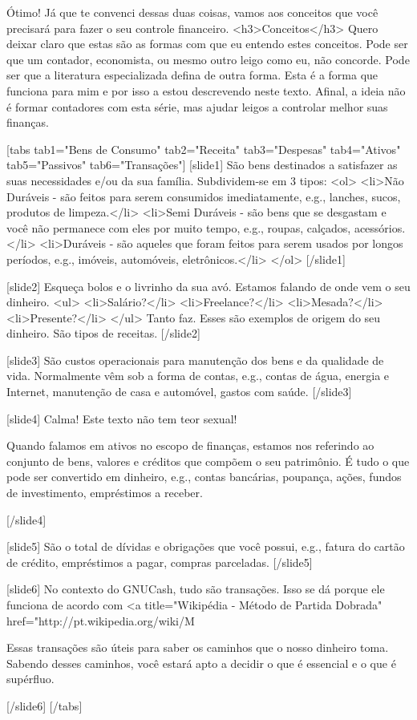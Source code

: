 Ótimo! Já que te convenci dessas duas coisas, vamos aos conceitos que você precisará para fazer o seu controle financeiro.
<h3>Conceitos</h3>
Quero deixar claro que estas são as formas com que eu entendo estes conceitos. Pode ser que um contador, economista, ou mesmo outro leigo como eu, não concorde. Pode ser que a literatura especializada defina de outra forma. Esta é a forma que funciona para mim e por isso a estou descrevendo neste texto. Afinal, a ideia não é formar contadores com esta série, mas ajudar leigos a controlar melhor suas finanças.

[tabs tab1="Bens de Consumo" tab2="Receita" tab3="Despesas" tab4="Ativos" tab5="Passivos" tab6="Transações"]
[slide1]
São bens destinados a satisfazer as suas necessidades e/ou da sua família. Subdividem-se em 3 tipos:
<ol>
    <li>Não Duráveis - são feitos para serem consumidos imediatamente, e.g., lanches, sucos, produtos de limpeza.</li>
    <li>Semi Duráveis - são bens que se desgastam e você não permanece com eles por muito tempo, e.g., roupas, calçados, acessórios.</li>
    <li>Duráveis - são aqueles que foram feitos para serem usados por longos períodos, e.g., imóveis, automóveis, eletrônicos.</li>
</ol>
[/slide1]

[slide2]
Esqueça bolos e o livrinho da sua avó. Estamos falando de onde vem o seu dinheiro.
<ul>
    <li>Salário?</li>
    <li>Freelance?</li>
    <li>Mesada?</li>
    <li>Presente?</li>
</ul>
Tanto faz. Esses são exemplos de origem do seu dinheiro. São tipos de receitas.
[/slide2]

[slide3]
São custos operacionais para manutenção dos bens e da qualidade de vida. Normalmente vêm sob a forma de contas, e.g., contas de água, energia e Internet, manutenção de casa e automóvel, gastos com saúde.
[/slide3]

[slide4]
Calma! Este texto não tem teor sexual!

Quando falamos em ativos no escopo de finanças, estamos nos referindo ao conjunto de bens, valores e créditos que compõem o seu patrimônio. É tudo o que pode ser convertido em dinheiro, e.g., contas bancárias, poupança, ações, fundos de investimento, empréstimos a receber.

[/slide4]

[slide5]
São o total de dívidas e obrigações que você possui, e.g., fatura do cartão de crédito, empréstimos a pagar, compras parceladas.
[/slide5]

[slide6]
No contexto do GNUCash, tudo são transações. Isso se dá porque ele funciona de acordo com <a title="Wikipédia - Método de Partida Dobrada" href="http://pt.wikipedia.org/wiki/M%

Essas transações são úteis para saber os caminhos que o nosso dinheiro toma. Sabendo desses caminhos, você estará apto a decidir o que é essencial e o que é supérfluo.

[/slide6]
[/tabs]
